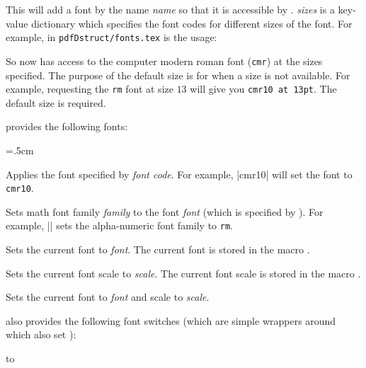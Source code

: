 This will add a font by the name {\it name} so that it is accessible by \pdftoolbox.
{\it sizes} is a key-value dictionary which specifies the font codes for different sizes of the font.
For example, in {\tt pdfDstruct/fonts.tex} is the usage:

\beginhi \color{white}
\endhi

So now \pdftoolbox{} has access to the computer modern roman font ({\tt cmr}) at the sizes specified.
The purpose of the default size is for when a size is not available.
For example, requesting the {\tt rm} font at size $13$ will give you {\tt cmr10 at 13pt}.
The default size is required.

\pdftoolbox{} provides the following fonts:

\quitvmode\vbox{\tabskip=.5cm}
\emacroexp

Applies the font specified by {\it font code}.
For example, \inlinecode|\applyfontcode cmr10| will set the font to {\tt cmr10}.
\emacroexp

Sets math font family {\it family} to the font {\it font} (which is specified by \gotomacro\addfont).
For example, \inlinecode|| sets the alpha-numeric font family to {\tt rm}.
\emacroexp

Sets the current font to {\it font}.
The current font is stored in the macro \macro\currfont\anchormacro\currfont.
\emacroexp

Sets the current font scale to {\it scale}.
The current font scale is stored in the macro \macro\currscale\anchormacro\currscale.
\emacroexp

Sets the current font to {\it font} and scale to {\it scale}.
\emacroexp

\pdftoolbox{} also provides the following font switches (which are simple wrappers around \macro\setfont{} which also set \macro\fam):

\hbox to\hsize{\hfil\inlinecode|\bf, \it, \bb, \sf, \sl, \frak, \scr|\hfil}

